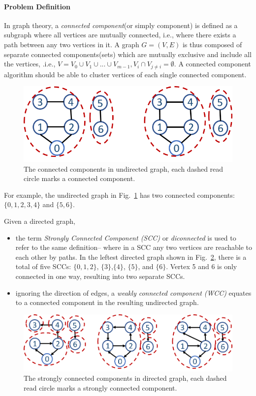 \documentclass[../main.tex]{subfiles}
\begin{document}
\paragraph{Problem Definition}
In graph theory, a \textit{connected component}(or simply component) is defined as a subgraph where all vertices are mutually connected,  i.e., where there exists a path between any two vertices in it. A  graph $G = (V, E)$ is thus composed of separate connected components(sets) which are mutually exclusive and include all the vertices, .i.e., $V = V_0 \cup V_1 \cup ... \cup V_{m-1}, V_i \cap V_{j\neq i} = \emptyset $. A connected component algorithm should be able to cluster vertices of each single connected component. 
\begin{figure}[h]
    \centering
    \includegraphics[width=0.6\columnwidth] {fig/undirected_cc_example.png}
    \caption{The connected components in undirected graph, each dashed read circle marks a connected component.}
    \label{fig:cc_undirected}
\end{figure}
For example, the undirected graph in Fig.~\ref{fig:cc_undirected} has two connected components: $\{0, 1, 2, 3, 4\}$ and $\{5, 6\}$. 

Given a  directed graph,
\begin{itemize}
    \item the term \textit{Strongly Connected Component (SCC)} or \textit{diconnected} is used to refer to the same definition-- where in a SCC any two vertices are reachable to each other by paths. In the leftest directed graph shown in  Fig.~\ref{fig:connected_components}, there is a total of five SCCs:  $\{0, 1, 2\}$, $\{3\}$,$\{4\}$, $\{5\}$, and $\{6\}$.  Vertex 5 and 6 is only connected in one way, resulting into two separate SCCs. 
    \item ignoring the direction of edges, a \textit{weakly connected component (WCC)} equates to a connected component in the resulting undirected graph.
\end{itemize} 
\begin{figure}[!ht]
    \centering
    \includegraphics[width=0.8\columnwidth] {fig/directed_scc_example.png}
    \caption{The strongly connected components in directed graph, each dashed read circle marks a strongly connected component.}
    \label{fig:connected_components}
\end{figure}
\end{document}

